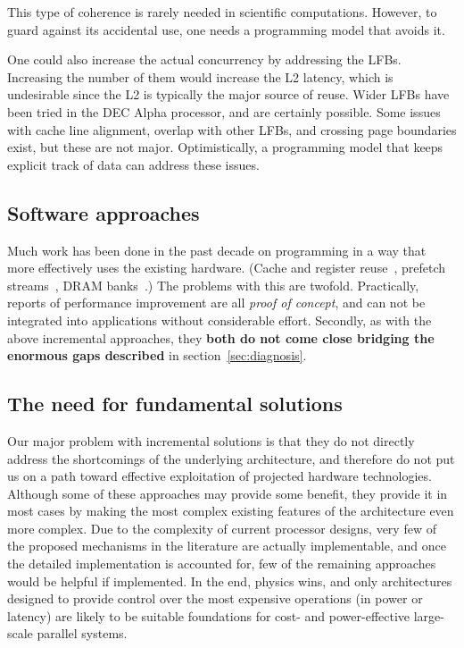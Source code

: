 This type of coherence is rarely needed in scientific computations.
However, to guard against its accidental use, one needs a programming
model that avoids it.

One could also increase the actual concurrency by addressing
the \acp{LFB}. Increasing the number of them would increase the L2 latency,
which is undesirable since the L2 is typically the major source of reuse.
Wider \acp{LFB} have been tried in the DEC Alpha processor, and are certainly possible.
Some issues with cache line alignment, overlap with other \acp{LFB},
and crossing page boundaries exist, but these are not major.
Optimistically, a programming model that keeps explicit track of data
can address these issues.

\subsection{Software approaches}

Much work has been done in the past decade on programming in a way
that more effectively uses the existing hardware. (Cache and register
reuse~\cite{DemEtAl:ieeeproc2004}, prefetch
streams~\cite{Lee:2012:prefetching}, DRAM banks~\cite{Diamond2011}.)
The problems with this are twofold. Practically, reports of
performance improvement are all \emph{proof of concept}, and can not
be integrated into applications without considerable effort.
Secondly, as with the above incremental approaches,
they \textbf{both do not come close bridging the enormous gaps
described} in section~\ref{sec:diagnosis}.

\subsection{The need for fundamental solutions}

Our major problem with incremental solutions is that they do not
directly address the shortcomings of the underlying architecture,
and therefore do not put us on a path toward effective exploitation
of projected hardware technologies.  Although some of these
approaches may provide some benefit, they provide it in most
cases by making the most complex existing features of the architecture even 
more complex.  Due to the complexity of current processor designs,
very few of the proposed mechanisms in the literature are  
actually implementable, and once the detailed implementation is 
accounted for, few of the remaining approaches would be helpful if implemented. 
In the end, physics wins, and only architectures designed to provide control
over the most expensive operations (in power or latency) are 
likely to be suitable foundations for cost- and power-effective 
large-scale parallel systems.

